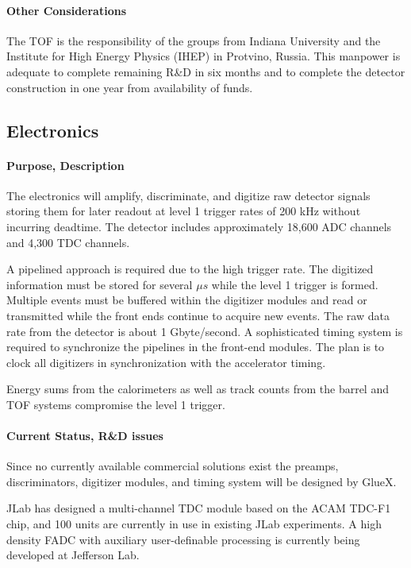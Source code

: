 \documentclass[11pt]{article}
\begin{document}
\paragraph{Other Considerations}

The TOF is the responsibility of the groups from Indiana University and the Institute for High Energy Physics
(IHEP) in Protvino, Russia.  This manpower is adequate to complete remaining R\&D in six months and to complete the
detector construction in one year from availability of funds.


\subsection{Electronics}

\paragraph{Purpose, Description}

The electronics will amplify, discriminate, and digitize raw detector signals
storing them for later readout at level 1 trigger rates of 200 kHz
without incurring deadtime.  The detector includes
approximately 18,600 ADC channels and 4,300 TDC channels.

A pipelined approach is required due to the high trigger rate.  The
digitized information must be stored for several $ \mu s $ while the
level 1 trigger is formed.  Multiple events must be buffered within
the digitizer modules and read or transmitted while the front ends continue to
acquire new events.  The raw data rate from the detector is about 1
Gbyte/second. A sophisticated timing system is required to synchronize the
pipelines in the front-end modules.  The plan is to clock all digitizers in synchronization
with the accelerator timing.

Energy sums from the calorimeters as well as track counts from the barrel and TOF systems
compromise the level 1 trigger.



\paragraph{Current Status, R\&D issues}


Since no currently available commercial solutions exist the 
preamps, discriminators, digitizer modules, and timing system
will be designed by GlueX.

JLab has designed a multi-channel TDC module based on the ACAM TDC-F1
chip, and 100 units are currently in use in existing JLab experiments.  A high density
FADC with auxiliary user-definable processing is currently being developed at
Jefferson Lab.
\end{document}
